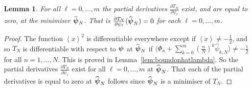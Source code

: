 \documentclass[aap]{imsart}
\newcommand{\fracpart}[1]{\left\langle #1 \right\rangle}
\newcommand{\sfracpart}[1]{\langle #1 \rangle}
\newtheorem{lemma}{Lemma}
\begin{document}
\begin{lemma}\label{lem:diffathatpsi}
For all $\ell = 0, \dots, m$ the partial derivatives $\frac{\partial T_N}{\partial \psi_\ell}$ exist, and are equal to zero, at the minimiser $\widehat{\boldsymbol{\psi}}_N$.  That is $\frac{\partial T_N}{\partial \psi_\ell}(\widehat{\boldsymbol{\psi}}_N) = 0$ for each $\ell = 0, \dots, m$.
\end{lemma}
\begin{proof}
The function $\fracpart{x}^2$ is differentiable everywhere except if $\fracpart{x} \neq -\frac{1}{2}$, and so $T_N$ is differentiable with respect to $\boldsymbol{\psi}$ at $\widehat{\boldsymbol{\psi}}_N$ if $\sfracpart{\Phi_n + \sum_{k=0}^m (\tfrac{n}{N})^k \widehat{\psi}_{k,N}} \neq -\tfrac{1}{2}$ for all $n = 1, \dots, N$.
This is proved in Lemma~\ref{lem:boundonhatlambda}.  So the partial derivatives $\frac{\partial T_N}{\partial \psi_\ell}$ exist for all $\ell = 0, \dots, m$ at $\widehat{\boldsymbol{\psi}}_N$.  That each of the partial derivatives is equal to zero at $\widehat{\boldsymbol{\psi}}_N$ follows since $\widehat{\boldsymbol{\psi}}_N$ is a minimiser of $T_N$.
\end{proof}
\end{document}
